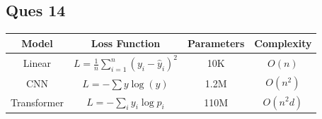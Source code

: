 \documentclass{article}
\begin{document}
\subsection{\textbf{Ques 14}}
\renewcommand{\arraystretch}{2.2} %

\begin{table}[h]
\centering
\begin{tabular}{|c|c|c|c|}
\hline
\textbf{Model} & \textbf{Loss Function} &\textbf{Parameters} & \textbf{Complexity} \\
\hline

Linear &$\displaystyle L=\frac{1}{n}\sum_{i=1}^{n}(y_i-\hat{y}_i)^2$ & 10K & $O(n)$ \\
\hline

CNN &
$\displaystyle L=-\sum y\log(\hat{y})$ & 1.2M & $O(n^2)$ \\
\hline

Transformer &
$\displaystyle L=-\sum_{i} y_i\log p_i$ & 110M & $O(n^2d)$ \\
\hline

\end{tabular}
\end{table}

\end{document}
